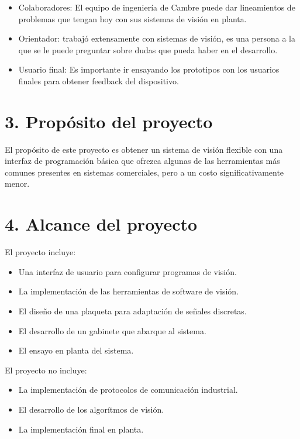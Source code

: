 \documentclass[
11pt, %
codirector, %
]{charter}
\begin{document}
\begin{itemize}
	\item Colaboradores: El equipo de ingeniería de Cambre puede dar lineamientos de problemas que tengan hoy con sus sistemas de visión en planta.
	\item Orientador: \supname trabajó extensamente con sistemas de visión, es una persona a la que se le puede preguntar sobre dudas que pueda haber en el desarrollo.
	\item Usuario final: Es importante ir ensayando los prototipos con los usuarios finales para obtener feedback del dispositivo.
\end{itemize}

\section{3. Propósito del proyecto}
\label{sec:proposito}

El propósito de este proyecto es obtener un sistema de visión flexible con una interfaz de programación básica que ofrezca algunas de las herramientas más comunes presentes en sistemas comerciales, pero a un costo significativamente menor.

\section{4. Alcance del proyecto}
\label{sec:alcance}


El proyecto incluye:

\begin{itemize}
	\item Una interfaz de usuario para configurar programas de visión.
	\item La implementación de las herramientas de software de visión.
	\item El diseño de una plaqueta para adaptación de señales discretas.
	\item El desarrollo de un gabinete que abarque al sistema.
	\item El ensayo en planta del sistema.
\end{itemize}

El proyecto no incluye:

\begin{itemize}
	\item La implementación de protocolos de comunicación industrial.
	\item El desarrollo de los algorítmos de visión.	
	\item La implementación final en planta.
\end{itemize}
\end{document}
